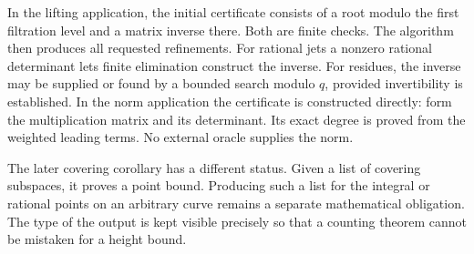 In the lifting application, the initial certificate consists of a root
modulo the first filtration level and a matrix inverse there. Both are
finite checks. The algorithm then produces all requested refinements.
For rational jets a nonzero rational determinant lets finite elimination
construct the inverse. For residues, the inverse may be supplied or
found by a bounded search modulo \(q\), provided invertibility is
established. In the norm application the certificate is constructed
directly: form the multiplication matrix and its determinant. Its exact
degree is proved from the weighted leading terms. No external oracle
supplies the norm.

The later covering corollary has a different status. Given a list of
covering subspaces, it proves a point bound. Producing such a list for
the integral or rational points on an arbitrary curve remains a separate
mathematical obligation. The type of the output is kept visible precisely
so that a counting theorem cannot be mistaken for a height bound.

